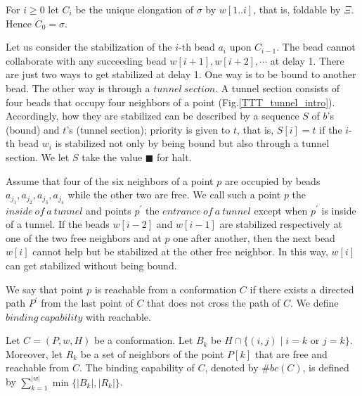 For $i \geq 0$ let $C_i$ be the unique elongation of $\sigma$ by $w[1..i]$, that is, foldable by $\Xi$. Hence $C_0 = \sigma$.


Let us consider the stabilization of the $i$-th bead $a_i$ upon $C_{i-1}$. The bead cannot collaborate with any succeeding bead $w[i+1],w[i+2],\cdots$ at delay 1. There are just two ways to get stabilized at delay 1. One way is to be bound to another bead. The other way is through a $tunnel\ section$. A tunnel section consists of four beads that occupy four neighbors of a point (Fig.\ref{TTT_tunnel_intro}). 
Accordingly, how they are stabilized can be described by a sequence $S$ of $b$'s (bound) and $t$'s (tunnel section); priority is given to $t$, that is, $S[i] = t$ if the $i$-th bead $w_i$ is stabilized not only by being bound but also through a tunnel section. 
We let $S$ take the value $\blacksquare$ for halt.

Assume that four of the six neighbors of a point $p$ are occupied by beads $a_{j_1},a_{j_2},a_{j_3},a_{j_4}$ while the other two are free. We call such a point $p$ the $inside\ of\ a\ tunnel$ and points $p^\prime$ the $entrance\ of\ a\ tunnel$ except when $p^\prime$ is inside of a tunnel. If the beads $w[i-2]$ and $w[i-1]$ are stabilized respectively at one of the two free neighbors and at $p$ one after another, then the next bead $w[i]$ cannot help but be stabilized at the other free neighbor. In this way, $w[i]$ can get stabilized without being bound.


We say that point $p$ is reachable from a conformation $C$ if there exists a directed path $P^\prime$ from the last point of $C$ that does not cross the path of $C$. We define $binding\ capability$ with reachable.

\begin{definition}
Let $C = (P,w,H)$ be a conformation.
Let $B_k$ be $H \cap \{ (i,j) \mid \mbox{$i=k$ or $j=k$} \}$. Moreover, let $R_k$ be a set of neighbors of the point $P[k]$ that are free and reachable from $C$.
 The binding capability of $C$, denoted by $\#bc(C)$, is defined by $\sum^{|w|}_{k=1} \min \{ |B_k|, |R_k|  \}$.
\end{definition}


